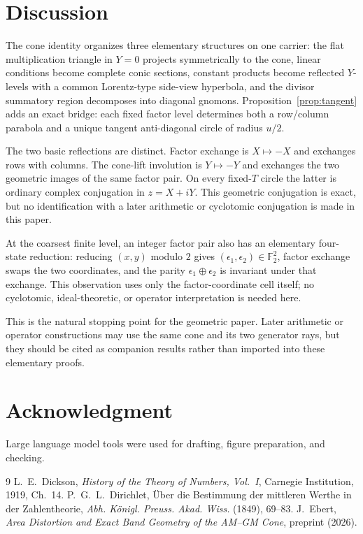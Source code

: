 \documentclass[11pt]{amsart}
\theoremstyle{remark}
\begin{document}
\section{Discussion}
The cone identity organizes three elementary structures on one carrier: the flat multiplication triangle in $Y=0$ projects symmetrically to the cone, linear conditions become complete conic sections, constant products become reflected $Y$-levels with a common Lorentz-type side-view hyperbola, and the divisor summatory region decomposes into diagonal gnomons. Proposition~\ref{prop:tangent} adds an exact bridge: each fixed factor level determines both a row/column parabola and a unique tangent anti-diagonal circle of radius $u/2$.

The two basic reflections are distinct. Factor exchange is $X\mapsto-X$ and exchanges rows with columns. The cone-lift involution is $Y\mapsto-Y$ and exchanges the two geometric images of the same factor pair. On every fixed-$T$ circle the latter is ordinary complex conjugation in $z=X+iY$. This geometric conjugation is exact, but no identification with a later arithmetic or cyclotomic conjugation is made in this paper.

At the coarsest finite level, an integer factor pair also has an elementary four-state reduction: reducing $(x,y)$ modulo $2$ gives $(\epsilon_1,\epsilon_2)\in\mathbb F_2^2$, factor exchange swaps the two coordinates, and the parity $\epsilon_1\oplus\epsilon_2$ is invariant under that exchange. This observation uses only the factor-coordinate cell itself; no cyclotomic, ideal-theoretic, or operator interpretation is needed here.

This is the natural stopping point for the geometric paper. Later arithmetic or operator constructions may use the same cone and its two generator rays, but they should be cited as companion results rather than imported into these elementary proofs.

\section*{Acknowledgment}
Large language model tools were used for drafting, figure preparation, and checking.

\begin{thebibliography}{9}
 L.~E.~Dickson, \emph{History of the Theory of Numbers, Vol.~I}, Carnegie Institution, 1919, Ch.~14.
 P.~G.~L.~Dirichlet, \"Uber die Bestimmung der mittleren Werthe in der Zahlentheorie, \emph{Abh. K\"onigl. Preuss. Akad. Wiss.} (1849), 69--83.
 J.~Ebert, \emph{Area Distortion and Exact Band Geometry of the AM--GM Cone}, preprint (2026).
\end{thebibliography}
\end{document}
